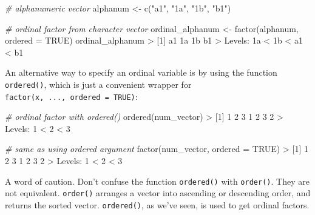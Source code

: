 \documentclass[
]{book}
\newenvironment{Shaded}{\begin{snugshade}}{\end{snugshade}}
\newcommand{\AttributeTok}[1]{\textcolor[rgb]{0.77,0.63,0.00}{#1}}
\newcommand{\CommentTok}[1]{\textcolor[rgb]{0.56,0.35,0.01}{\textit{#1}}}
\newcommand{\ConstantTok}[1]{\textcolor[rgb]{0.00,0.00,0.00}{#1}}
\newcommand{\DecValTok}[1]{\textcolor[rgb]{0.00,0.00,0.81}{#1}}
\newcommand{\FunctionTok}[1]{\textcolor[rgb]{0.00,0.00,0.00}{#1}}
\newcommand{\NormalTok}[1]{#1}
\newcommand{\OtherTok}[1]{\textcolor[rgb]{0.56,0.35,0.01}{#1}}
\newcommand{\SpecialCharTok}[1]{\textcolor[rgb]{0.00,0.00,0.00}{#1}}
\newcommand{\StringTok}[1]{\textcolor[rgb]{0.31,0.60,0.02}{#1}}
\begin{document}
\begin{Shaded}
\begin{Highlighting}[]
\CommentTok{\# alphanumeric vector}
\NormalTok{alphanum }\OtherTok{\textless{}{-}} \FunctionTok{c}\NormalTok{(}\StringTok{"a1"}\NormalTok{, }\StringTok{"1a"}\NormalTok{, }\StringTok{"1b"}\NormalTok{, }\StringTok{"b1"}\NormalTok{)}

\CommentTok{\# ordinal factor from character vector}
\NormalTok{ordinal\_alphanum }\OtherTok{\textless{}{-}} \FunctionTok{factor}\NormalTok{(alphanum, }\AttributeTok{ordered =} \ConstantTok{TRUE}\NormalTok{)}
\NormalTok{ordinal\_alphanum}
\SpecialCharTok{\textgreater{}}\NormalTok{ [}\DecValTok{1}\NormalTok{] a1 1a 1b b1}
\SpecialCharTok{\textgreater{}}\NormalTok{ Levels}\SpecialCharTok{:}\NormalTok{ 1a }\SpecialCharTok{\textless{}}\NormalTok{ 1b }\SpecialCharTok{\textless{}}\NormalTok{ a1 }\SpecialCharTok{\textless{}}\NormalTok{ b1}
\end{Highlighting}
\end{Shaded}

An alternative way to specify an ordinal variable is by using the function
\texttt{ordered()}, which is just a convenient wrapper for
\texttt{factor(x,\ ...,\ ordered\ =\ TRUE)}:

\begin{Shaded}
\begin{Highlighting}[]
\CommentTok{\# ordinal factor with ordered()}
\FunctionTok{ordered}\NormalTok{(num\_vector)}
\SpecialCharTok{\textgreater{}}\NormalTok{ [}\DecValTok{1}\NormalTok{] }\DecValTok{1} \DecValTok{2} \DecValTok{3} \DecValTok{1} \DecValTok{2} \DecValTok{3} \DecValTok{2}
\SpecialCharTok{\textgreater{}}\NormalTok{ Levels}\SpecialCharTok{:} \DecValTok{1} \SpecialCharTok{\textless{}} \DecValTok{2} \SpecialCharTok{\textless{}} \DecValTok{3}

\CommentTok{\# same as using \textquotesingle{}ordered\textquotesingle{} argument}
\FunctionTok{factor}\NormalTok{(num\_vector, }\AttributeTok{ordered =} \ConstantTok{TRUE}\NormalTok{)}
\SpecialCharTok{\textgreater{}}\NormalTok{ [}\DecValTok{1}\NormalTok{] }\DecValTok{1} \DecValTok{2} \DecValTok{3} \DecValTok{1} \DecValTok{2} \DecValTok{3} \DecValTok{2}
\SpecialCharTok{\textgreater{}}\NormalTok{ Levels}\SpecialCharTok{:} \DecValTok{1} \SpecialCharTok{\textless{}} \DecValTok{2} \SpecialCharTok{\textless{}} \DecValTok{3}
\end{Highlighting}
\end{Shaded}

A word of caution. Don't confuse the function \texttt{ordered()} with \texttt{order()}. They
are not equivalent. \texttt{order()} arranges a vector into ascending or descending
order, and returns the sorted vector. \texttt{ordered()}, as we've seen, is used to
get ordinal factors.
\end{document}
